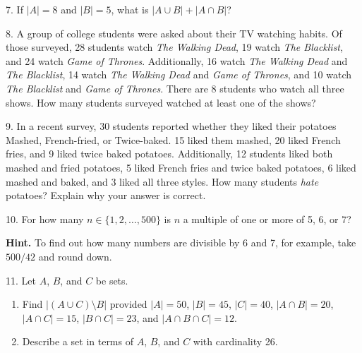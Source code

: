 \documentclass[10pt,]{book}
\theoremstyle{plain}
\theoremstyle{definition}
\theoremstyle{definition}
\theoremstyle{definition}
\theoremstyle{definition}
\numberwithin{equation}{chapter}
\newcommand{\card}[1]{\left| #1 \right|}
\begin{document}
\begin{exerciselist}
\item[7.]\hypertarget{exercise-90}{}\hypertarget{p-768}{}%
If \(\card{A} = 8\) and \(\card{B} = 5\), what is \(\card{A \cup B} + \card{A \cap B}\)?%
\par\smallskip
\item[8.]\hypertarget{exercise-91}{}\hypertarget{p-770}{}%
A group of college students were asked about their TV watching habits. Of those surveyed, 28 students watch \emph{The Walking Dead}, 19 watch \emph{The Blacklist}, and 24 watch \emph{Game of Thrones}. Additionally, 16 watch \emph{The Walking Dead} and \emph{The Blacklist}, 14 watch \emph{The Walking Dead} and \emph{Game of Thrones}, and 10 watch \emph{The Blacklist} and \emph{Game of Thrones}. There are 8 students who watch all three shows. How many students surveyed watched at least one of the shows?%
\par\smallskip
\item[9.]\hypertarget{exercise-92}{}\hypertarget{p-772}{}%
In a recent survey, 30 students reported whether they liked their potatoes Mashed, French-fried, or Twice-baked. 15 liked them mashed, 20 liked French fries, and 9 liked twice baked potatoes. Additionally, 12 students liked both mashed and fried potatoes, 5 liked French fries and twice baked potatoes, 6 liked mashed and baked, and 3 liked all three styles. How many students \emph{hate} potatoes? Explain why your answer is correct.%
\par\smallskip
\item[10.]\hypertarget{exercise-93}{}\hypertarget{p-773}{}%
For how many \(n \in \{1,2, \ldots, 500\}\) is \(n\) a multiple of one or more of 5, 6, or 7?%
\par\smallskip
\par\smallskip%
\noindent\textbf{Hint.}\hypertarget{hint-4}{}\quad%
\hypertarget{p-774}{}%
To find out how many numbers are divisible by 6 and 7, for example, take \(500/42\) and round down.%
\item[11.]\hypertarget{exercise-94}{}\hypertarget{p-775}{}%
Let \(A\), \(B\), and \(C\) be sets. \leavevmode%
\begin{enumerate}[label=(\alph*)]
\item\hypertarget{li-355}{}Find \(\card{(A \cup C)\setminus B}\) provided \(\card{A} = 50\), \(\card{B} = 45\), \(\card{C} = 40\), \(\card{A\cap B} = 20\), \(\card{A \cap C} = 15\), \(\card{B \cap C} = 23\), and \(\card{A \cap B \cap C} = 12\).%
\item\hypertarget{li-356}{}Describe a set in terms of \(A\), \(B\), and \(C\) with cardinality 26.%

\end{enumerate}
\end{exerciselist}
\end{document}
